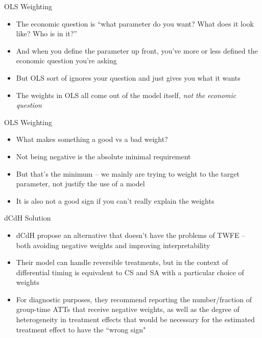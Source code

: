 \documentclass{beamer}
\begin{document}
\begin{frame}{OLS Weighting}

\begin{itemize}
\item The economic question is ``what parameter do you want? What does it look like? Who is in it?''
\item And when you define the parameter up front, you've more or less defined the economic question you're asking
\item But OLS sort of ignores your question and just gives you what it wants
\item The weights in OLS all come out of the model itself, \emph{not the economic question}
\end{itemize}

\end{frame}

\begin{frame}{OLS Weighting}

\begin{itemize}
\item What makes something a good vs a bad weight?
\item Not being negative is the absolute minimal requirement
\item But that's the minimum -- we mainly are trying to weight to the target parameter, not justify the use of a model
\item It is also not a good sign if you can't really explain the weights
\end{itemize}

\end{frame}

\begin{frame}{dCdH Solution}

\begin{itemize}
\item dCdH propose an alternative that doesn't have the problems of TWFE -- both avoiding negative weights and improving interpretability
\item Their model can handle reversible treatments, but in the context of differential timing is equivalent to CS and SA with a particular choice of weights
\item For diagnostic purposes, they recommend reporting the number/fraction of group-time ATTs that receive negative weights, as well as the degree of heterogeneity in treatment eﬀects that would be necessary for the estimated treatment eﬀect to have the “wrong sign"

\end{itemize}

\end{frame}
\end{document}
